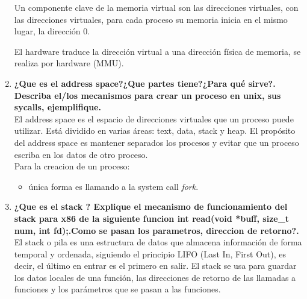 \documentclass[../main.tex]{subfiles}
\begin{document}
\begin{enumerate}
                Un componente clave de la memoria virtual son las direcciones virtuales, con las direcciones virtuales, para cada proceso su memoria inicia en el mismo lugar, la dirección 0. 
                
                El hardware traduce la dirección virtual a una dirección física de memoria, se realiza por hardware (MMU).

            \item 
                \textbf{¿Que es el address space?¿Que partes tiene?¿Para qué sirve?. Describa el/los mecanismos para crear un proceso en unix, sus sycalls, ejemplifique.}\\
                El address space es el espacio de direcciones virtuales que un proceso puede utilizar.  Está dividido en varias áreas: text, data, stack y heap.
                El propósito del address space es mantener separados los procesos y evitar que un proceso escriba en los datos de otro proceso.\\
                
                Para la creacion de un proceso:
                \begin{itemize}
                    \item única forma es llamando a la system call \textit{fork}.
                \end{itemize}
            
            
            \item 
                \textbf{¿Que es el stack ? Explique el mecanismo de funcionamiento del stack para x86 de la siguiente funcion int read(void *buff, size\_t num, int fd);.Como se pasan los parametros, direccion de retorno?.}\\

                El stack o pila es una estructura de datos que almacena información de forma temporal y ordenada, siguiendo el principio LIFO (Last In, First Out), es decir, el último en entrar es el primero en salir. El stack se usa para guardar los datos locales de una función, las direcciones de retorno de las llamadas a funciones y los parámetros que se pasan a las funciones.\\
                

\end{enumerate}
\end{document}
